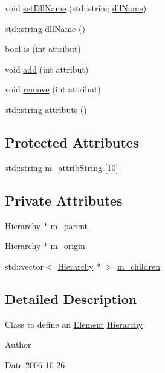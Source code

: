 \begin{DoxyCompactItemize}
void \hyperlink{classObject_a870c5af919958c2136623b2d7816d123}{set\+Dll\+Name} (std\+::string \hyperlink{classObject_a2e3947f2870094c332d7454117f3ec63}{dll\+Name})
\item 
std\+::string \hyperlink{classObject_a2e3947f2870094c332d7454117f3ec63}{dll\+Name} ()
\item 
bool \hyperlink{classAttrib_a704f26af560909ad22065083bb7d4c34}{is} (int attribut)
\item 
void \hyperlink{classAttrib_a235f773af19c900264a190b00a3b4ad7}{add} (int attribut)
\item 
void \hyperlink{classAttrib_a7d4ef7e32d93cb287792b87b857e79f3}{remove} (int attribut)
\item 
std\+::string \hyperlink{classAttrib_aee7bbf16b144887f196e1341b24f8a26}{attributs} ()
\end{DoxyCompactItemize}
\subsection*{Protected Attributes}
\begin{DoxyCompactItemize}
\item 
std\+::string \hyperlink{classAttrib_a3414521d7a82476e874b25a5407b5e63}{m\+\_\+attrib\+String} \mbox{[}10\mbox{]}
\end{DoxyCompactItemize}
\subsection*{Private Attributes}
\begin{DoxyCompactItemize}
\item 
\hyperlink{classHierarchy}{Hierarchy} $\ast$ \hyperlink{classHierarchy_a5814bb280d4e8539ab25ab6cbfb9cc4f}{m\+\_\+parent}
\item 
\hyperlink{classHierarchy}{Hierarchy} $\ast$ \hyperlink{classHierarchy_a16c73e557d3a7c156ffb5dc4102d148e}{m\+\_\+origin}
\item 
std\+::vector$<$ \hyperlink{classHierarchy}{Hierarchy} $\ast$ $>$ \hyperlink{classHierarchy_a038816763941fd4a930504917f60483b}{m\+\_\+children}
\end{DoxyCompactItemize}


\subsection{Detailed Description}
Class to define an \hyperlink{classElement}{Element} \hyperlink{classHierarchy}{Hierarchy}

\begin{DoxyAuthor}{Author}

\end{DoxyAuthor}
\begin{DoxyDate}{Date}
2006-\/10-\/26 
\end{DoxyDate}


